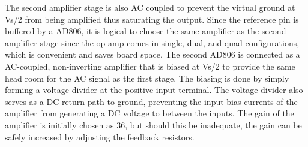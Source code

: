 \documentclass[a4paper,11pt]{article}
\begin{document}
The second amplifier stage is also AC coupled to prevent the virtual
ground at Vs/2 from being amplified thus saturating the output. Since
the reference pin is buffered by a AD806, it is logical to choose the
same amplifier as the second amplifier stage since the op amp comes in
single, dual, and quad configurations, which is convenient and saves
board space. The second AD806 is connected as a AC-coupled,
non-inverting amplifier that is biased at Vs/2 to provide the same
head room for the AC signal as the first stage. The biasing is done by
simply forming a voltage divider at the positive input terminal. The
voltage divider also serves as a DC return path to ground, preventing
the input bias currents of the amplifier from generating a DC voltage
to between the inputs. The gain of the amplifier is initially chosen
as 36, but should this be inadequate, the gain can be safely increased
by adjusting the feedback resistors.
\end{document}
